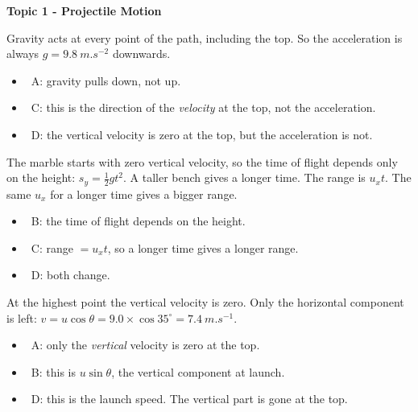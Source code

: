 \documentclass[12pt]{article}
\newcommand\anstopic[1]{\par\Needspace{8\baselineskip}\vspace{4mm}%
  \begin{center}{\headfont\bfseries\fontsize{14}{18}\selectfont #1\par}\end{center}\vspace{2pt}}
\begin{document}
\begin{practiceanswers}

\anstopic{Topic 1 - Projectile Motion}

\begin{practiceans}
  Gravity acts at every point of the path, including the top. So the acceleration is always
  $g = \qty{9.8}{m.s^{-2}}$ downwards.
  \begin{itemize}
    \item \xmark\ A: gravity pulls down, not up.
    \item \xmark\ C: this is the direction of the \emph{velocity} at the top, not the acceleration.
    \item \xmark\ D: the vertical velocity is zero at the top, but the acceleration is not.
  \end{itemize}
\end{practiceans}

\begin{practiceans}
  The marble starts with zero vertical velocity, so the time of flight depends only on the height:
  $s_y = \frac{1}{2}gt^2$. A taller bench gives a longer time. The range is $u_x t$. The same $u_x$
  for a longer time gives a bigger range.
  \begin{itemize}
    \item \xmark\ B: the time of flight depends on the height.
    \item \xmark\ C: range $= u_x t$, so a longer time gives a longer range.
    \item \xmark\ D: both change.
  \end{itemize}
\end{practiceans}

\begin{practiceans}
  At the highest point the vertical velocity is zero. Only the horizontal component is left:
  $v = u\cos\theta = 9.0 \times \cos 35^\circ = \qty{7.4}{m.s^{-1}}$.
  \begin{itemize}
    \item \xmark\ A: only the \emph{vertical} velocity is zero at the top.
    \item \xmark\ B: this is $u\sin\theta$, the vertical component at launch.
    \item \xmark\ D: this is the launch speed. The vertical part is gone at the top.
  \end{itemize}
\end{practiceans}


\end{practiceanswers}
\end{document}
